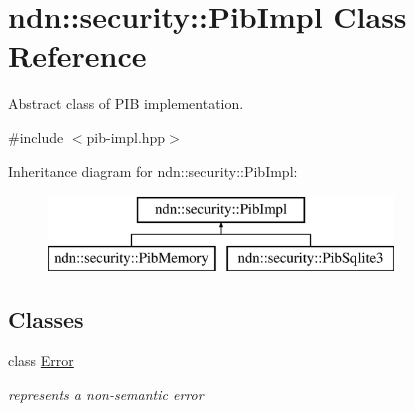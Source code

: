 \hypertarget{classndn_1_1security_1_1PibImpl}{}\section{ndn\+:\+:security\+:\+:Pib\+Impl Class Reference}
\label{classndn_1_1security_1_1PibImpl}


Abstract class of P\+IB implementation.  




{\ttfamily \#include $<$pib-\/impl.\+hpp$>$}

Inheritance diagram for ndn\+:\+:security\+:\+:Pib\+Impl\+:\begin{figure}[H]
\begin{center}
\leavevmode
\includegraphics[height=2.000000cm]{classndn_1_1security_1_1PibImpl}
\end{center}
\end{figure}
\subsection*{Classes}
\begin{DoxyCompactItemize}
\item 
class \hyperlink{classndn_1_1security_1_1PibImpl_1_1Error}{Error}
\begin{DoxyCompactList}\small\item\em represents a non-\/semantic error \end{DoxyCompactList}\end{DoxyCompactItemize}
